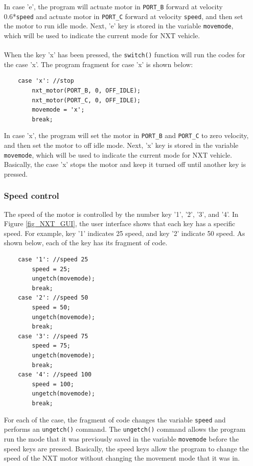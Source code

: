 \documentclass[12pt]{article}
\begin{document}
In case 'e', the program will actuate motor in \verb+PORT_B+ forward at velocity 0.6*\verb+speed+ and 
actuate motor in \verb+PORT_C+ forward at velocity \verb+speed+, and then set the motor to run idle 
mode. Next, 'e' key is stored in the variable \verb+movemode+, which will be used to indicate the 
current mode for NXT vehicle.
\\ \\
\noindent
When the key 'x' has been pressed, the \verb+switch()+ function will run the codes for the case 'x'.
The program fragment for case 'x' is shown below:
\begin{verbatim} 
    case 'x': //stop
        nxt_motor(PORT_B, 0, OFF_IDLE);
        nxt_motor(PORT_C, 0, OFF_IDLE);
        movemode = 'x';
        break;
\end{verbatim}
In case 'x', the program will set the motor in \verb+PORT_B+ and \verb+PORT_C+ to zero velocity, and then
    set the motor to off idle mode.
Next, 'x' key is stored in the variable \verb+movemode+, which will be used to indicate the current mode for NXT vehicle.
Basically, the case 'x' stops the motor and keep it turned off until another key is pressed.

\subsubsection*{Speed control}
The speed of the motor is controlled by the number key '1', '2', '3', and '4'.
In Figure \ref{fig_NXT_GUI}, the user interface shows that each key has a specific speed.
For example, key '1' indicates 25 speed, and key '2' indicate 50 speed.
As shown below, each of the key has its fragment of code.

\begin{verbatim}
    case '1': //speed 25
        speed = 25;
        ungetch(movemode);
        break;
    case '2': //speed 50
        speed = 50;
        ungetch(movemode);
        break;
    case '3': //speed 75
        speed = 75;
        ungetch(movemode);
        break;
    case '4': //speed 100
        speed = 100;
        ungetch(movemode);
        break;
\end{verbatim}
\noindent
For each of the case, the fragment of code changes the variable \verb+speed+ and performs an \verb+ungetch()+ command.
The \verb+ungetch()+ command allows the program run the mode that it was previously saved in the variable \verb+movemode+
    before the speed keys are pressed.
Basically, the speed keys allow the program to change the speed of the NXT motor without changing the movement
    mode that it was in.
\end{document}
